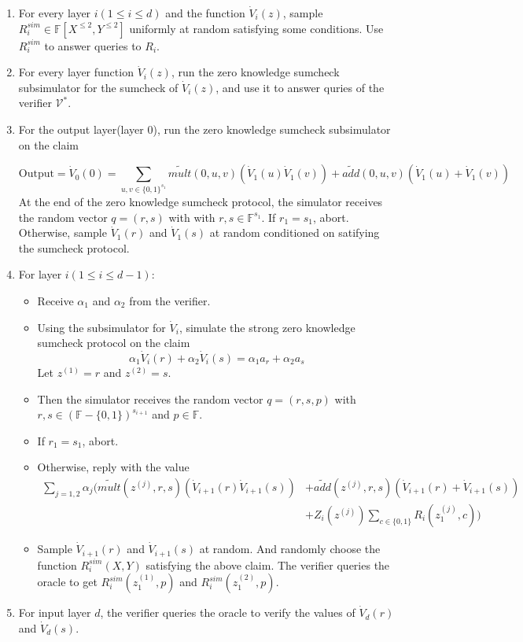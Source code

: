 \begin{enumerate}

\item For every layer $i(1 \leq i \leq d)$ and the function $\dot{V}_i(z)$, sample $R_i^{sim} \in \mathbb{F}[X^{\leqslant 2}, Y^{\leqslant 2}]$ uniformly at random satisfying some conditions. Use $R_i^{sim}$ to answer queries to $R_i$.

\item For every layer function $\dot{V}_i(z)$, run the zero knowledge sumcheck subsimulator for the sumcheck of $\dot{V}_i(z)$, and use it to answer quries of the verifier $\mathcal{V}^*$. 

\item For the output layer(layer $0$), run the zero knowledge sumcheck subsimulator on the claim

$$\text{Output} = \dot{V}_0(0) = \sum_{u, v\in \{0,1\}^{s_1}}\tilde{mult}(0, u, v)(\dot{V}_1(u)\dot{V}_1(v))+\tilde{add}(0,u,v)(\dot{V}_1(u)+\dot{V}_1(v))$$ 
At the end of the zero knowledge sumcheck protocol, the simulator receives the random vector $q = (r, s)$ with with $r, s \in \mathbb{F}^{s_1}$. If $r_1 = s_1$, abort. Otherwise, sample $\dot{V}_1(r)$ and $\dot{V}_1(s)$ at random conditioned on satifying the sumcheck protocol. 
\item For layer $i(1 \leq i \leq d - 1)$:
	\begin{itemize}
	\item Receive $\alpha_1$ and $\alpha_2$ from the verifier.
	\item Using the subsimulator for $\dot{V}_i$, simulate the strong zero knowledge sumcheck protocol on the claim
	$$\alpha_1 \dot{V}_i(r) + \alpha_2 \dot{V}_i(s) = \alpha_1 a_{r} + \alpha_2 a_{s}$$
	Let $z^{(1)} = r$ and $z^{(2)} = s$. 
	\item Then the simulator receives the random vector $q = (r, s, p)$ with $r, s \in (\mathbb{F}-\{0, 1\})^{s_{i+1}}$ and $p \in \mathbb{F}$. 
	\item If $r_1 = s_1$, abort. 
	\item Otherwise, reply with the value
	\begin{align}
		\sum_{j = 1, 2} \alpha_j (\tilde{mult}(z^{(j)}, r, s)(\dot{V}_{i+1}(r)\dot{V}_{i+1}(s))&+\tilde{add}(z^{(j)},r,s)(\dot{V}_{i+1}(r)+\dot{V}_{i+1}(s))\\
 		&+ Z_i(z^{(j)})\sum\limits_{c \in \{0, 1\}}R_i(z_1^{(j)}, c))
	\end{align}
	\item Sample $\dot{V}_{i+1}(r)$ and $\dot{V}_{i+1}(s)$ at random. And randomly choose the function $R^{sim}_i(X, Y)$ satisfying the above claim. The verifier queries the oracle to get $R^{sim}_i(z_1^{(1)}, p)$ and $R^{sim}_i(z_1^{(2)}, p)$.   
	\end{itemize}
\item For input layer $d$, the verifier queries the oracle to verify the values of $\dot{V}_d(r)$ and $\dot{V}_d(s)$.
\end{enumerate} 

